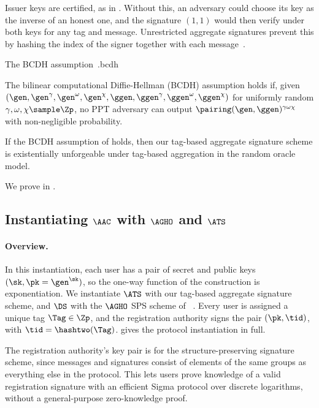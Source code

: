 Issuer keys are certified, as in . Without this, an adversary
could choose its key as the inverse of an honest one, and the signature $(1, 1)$
would then verify under both keys for any tag and message. Unrestricted
aggregate signatures prevent this by hashing the index of the signer together
with each message~\cite{ICALP:BelNamNev07}.

  \begin{assumptionbox}{The BCDH assumption~\cite{C:BonFra01}.}{bcdh}

    The bilinear computational Diffie-Hellman (BCDH) assumption holds if, given $(\gen, \gen^\gamma, \gen^\omega,
\gen^\chi, \ggen, \ggen^\gamma, \ggen^\omega, \ggen^\chi)$ for uniformly
random $\gamma, \omega, \chi \sample \Zp$, no PPT adversary can output
$\pairing(\gen, \ggen)^{\gamma\omega\chi}$ with non-negligible probability.

  \end{assumptionbox}

  \begin{theorem}\label{thm:agg-creds-thm-1} If the BCDH assumption of  holds, then
our tag-based aggregate signature scheme is existentially unforgeable
under tag-based aggregation in the random oracle model.  \end{theorem}

We prove  in .

\subsection{Instantiating $\AAC$ with $\AGHO$ and $\ATS$}\label{sec:agg-creds-aac-inst}

\paragraph{Overview.} In this instantiation, each user has a pair of secret and
public keys $(\sk, \pk = \gen^\sk)$, so the one-way function of the construction
is exponentiation. We instantiate $\ATS$ with our tag-based aggregate signature scheme, and $\DS$
with the $\AGHO$ SPS scheme of ~\cite{C:AGHO11}. Every user is
assigned a unique tag $\Tag \in \Zp$, and the registration authority signs the
pair $(\pk, \tid)$, with $\tid = \hashtwo(\Tag)$.  gives the
protocol instantiation in full.

The registration authority's key pair is for the structure-preserving signature
scheme, since messages and signatures consist of elements of the same groups as
everything else in the protocol. This lets users prove knowledge of a valid
registration signature with an efficient Sigma protocol over discrete
logarithms, without a general-purpose zero-knowledge proof.

